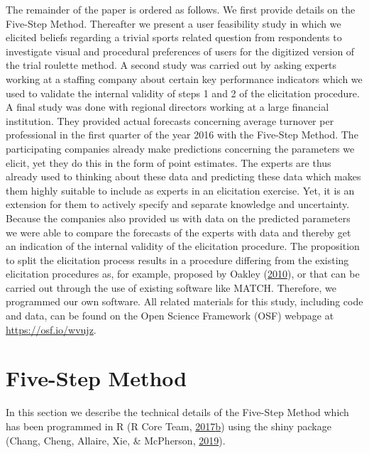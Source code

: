 \documentclass[openright,titlepage,12pt,a4paper]{book}
\begin{document}
The remainder of the paper is ordered as follows. We first provide details on the Five-Step Method. Thereafter we present a user feasibility study in which we elicited beliefs regarding a trivial sports related question from respondents to investigate visual and procedural preferences of users for the digitized version of the trial roulette method. A second study was carried out by asking experts working at a staffing company about certain key performance indicators which we used to validate the internal validity of steps 1 and 2 of the elicitation procedure. A final study was done with regional directors working at a large financial institution. They provided actual forecasts concerning average turnover per professional in the first quarter of the year 2016 with the Five-Step Method. The participating companies already make predictions concerning the parameters we elicit, yet they do this in the form of point estimates. The experts are thus already used to thinking about these data and predicting these data which makes them highly suitable to include as experts in an elicitation exercise. Yet, it is an extension for them to actively specify and separate knowledge and uncertainty. Because the companies also provided us with data on the predicted parameters we were able to compare the forecasts of the experts with data and thereby get an indication of the internal validity of the elicitation procedure. The proposition to split the elicitation process results in a procedure differing from the existing elicitation procedures as, for example, proposed by Oakley (\protect\hyperlink{ref-oakley_eliciting_2010}{2010}), or that can be carried out through the use of existing software like MATCH. Therefore, we programmed our own software. All related materials for this study, including code and data, can be found on the Open Science Framework (OSF) webpage at \url{https://osf.io/wvujz}.

\hypertarget{five-step-method}{%
\section{Five-Step Method}\label{five-step-method}}

In this section we describe the technical details of the Five-Step Method which has been programmed in R (R Core Team, \protect\hyperlink{ref-r_core_team_r:_2017}{2017}\protect\hyperlink{ref-r_core_team_r:_2017}{b}) using the shiny package (Chang, Cheng, Allaire, Xie, \& McPherson, \protect\hyperlink{ref-R-shiny}{2019}).
\end{document}
